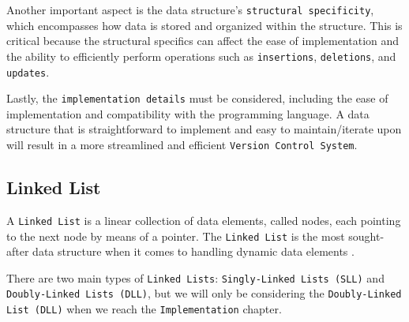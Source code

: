 Another important aspect is the data structure's \lstinline{structural specificity}, which encompasses how data is stored and organized within the structure. This is critical because the structural specifics can affect the ease of implementation and the ability to efficiently perform operations such as \lstinline{insertions}, \lstinline{deletions}, and \lstinline{updates}.

Lastly, the \lstinline{implementation details} must be considered, including the ease of implementation and compatibility with the programming language. A data structure that is straightforward to implement and easy to maintain/iterate upon will result in a more streamlined and efficient \lstinline{Version Control System}.
% 
% 
\subsection{Linked List}
A \lstinline{Linked List} is a linear collection of data elements, called nodes, each pointing to the next node by means of a pointer. The \lstinline{Linked List} is the most sought-after data structure when it comes to handling dynamic data elements \cite{ravikiran_2022}.

There are two main types of \lstinline{Linked Lists}: \lstinline{Singly-Linked Lists (SLL)} and \lstinline{Doubly-Linked Lists (DLL)}, but we will only be considering the \lstinline{Doubly-Linked List (DLL)} when we reach the \lstinline{Implementation} chapter.
